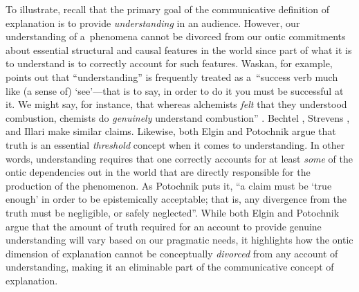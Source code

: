To illustrate, recall that the primary goal of the communicative definition of explanation is to provide \textit{understanding} in an audience. However, our understanding of a~phenomena cannot be divorced from our ontic commitments about essential structural and causal features in the world since part of what it is to understand is to correctly account for such features. Waskan, for example, points out that ``understanding'' is frequently treated as a~``success verb much like (a sense of) ‘see'---that is to say, in order to do it you must be successful at it. We might say, for instance, that whereas alchemists \textit{felt} that they understood combustion, chemists do \textit{genuinely} understand combustion''
\parencite[][emphasis in the text]{waskan_intelligibility_2011}. %
 Bechtel 
\parencite*[][p.14]{bechtel_mental_2008}, %
 Strevens 
\parencite*[][p.3]{strevens_depth_2011}, %
 and Illari 
\parencite*[][p.245]{illari_mechanistic_2013} %
 make similar claims. Likewise, both Elgin 
\parencite*[][]{elgin_true_2004} %
 and Potochnik 
\parencite*[][]{potochnik_diverse_2015} %
 argue that truth is an essential \textit{threshold} concept when it comes to understanding. In other words, understanding requires that one correctly accounts for at least \textit{some} of the ontic dependencies out in the world that are directly responsible for the production of the phenomenon. As Potochnik 
\parencite*[][p.73]{potochnik_diverse_2015} %
 puts it, ``a claim must be ‘true enough' in order to be epistemically acceptable; that is, any divergence from the truth must be negligible, or safely neglected''. While both Elgin and Potochnik argue that the amount of truth required for an account to provide genuine understanding will vary based on our pragmatic needs, it highlights how the ontic dimension of explanation cannot be conceptually \textit{divorced} from any account of understanding, making it an eliminable part of the communicative concept of explanation.

